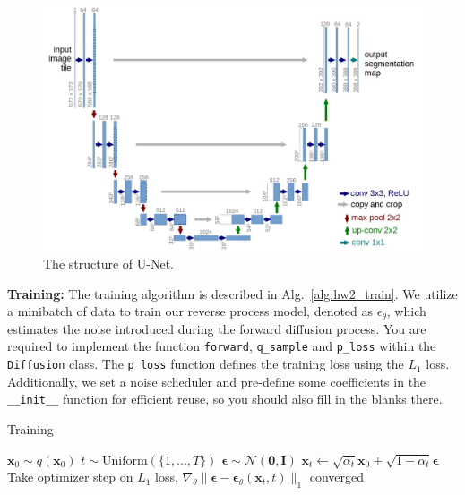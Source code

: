\documentclass[11pt,addpoints,answers]{exam}
\newcommand{\xv}{\mathbf{x}}
\newcommand{\epsilonv   }{\boldsymbol \epsilon   }
\begin{document}
\begin{questions}
    \begin{figure}[H]
        \centering
        \includegraphics[width=0.5\linewidth]{fig/unet_architecture.jpeg}
        \caption{The structure of U-Net.}
        \label{fig:unet}
    \end{figure}


    \textbf{Training:} The training algorithm is described in Alg.~\ref{alg:hw2_train}. We utilize a minibatch of data to train our reverse process model, denoted as $\epsilon_\theta$, which estimates the noise introduced during the forward diffusion process. You are required to implement the function \lstinline{forward}, \lstinline{q_sample} and \lstinline{p_loss} within the \lstinline{Diffusion} class. The \lstinline{p_loss} function defines the training loss using the $L_1$ loss. Additionally, we set a noise scheduler and pre-define some coefficients in the \lstinline{__init__} function for efficient reuse, so you should also fill in the blanks there. 

    \begin{center}
    \begin{minipage}{.8\linewidth}
    \begin{algorithm}[H]
    \caption{Training}\label{alg:hw2_train}
        \begin{algorithmic}[1]
            \Repeat
            \State $\xv_0 \sim q(\xv_0)$
            \State $t\sim \text{Uniform}(\{1,...,T\})$
            \State $\epsilonv \sim \mathcal{N}(\boldsymbol{0},\boldsymbol{I})$
            \State $\xv_t \gets \sqrt{\bar{\alpha_t}}\xv_0 + \sqrt{1 - \bar\alpha_t} \epsilonv$ 
            \State Take optimizer step on $L_1$ loss, 
             $\nabla_\theta \| \epsilonv - \boldsymbol{\epsilon}_\theta (\xv_t, t) \|_1$
            \Until converged
        \end{algorithmic}
    \end{algorithm}
    \end{minipage}
    \end{center}
    \vspace{1em}



\end{questions}
\end{document}
